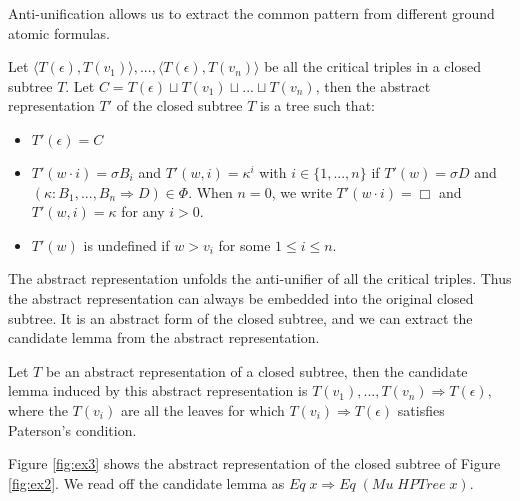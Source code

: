 \documentclass{llncs}
\newcommand{\Conid}[1]{\mathit{#1}}
\newcommand{\Varid}[1]{\mathit{#1}}
\renewcommand{\leq}{\leqslant}
\begin{document}
Anti-unification allows us to extract the common pattern from different ground atomic formulas.

\begin{definition}
  \label{abs:rep}
  Let $\langle T(\epsilon), T(v_1)\rangle,..., \langle T(\epsilon), T(v_n) \rangle$ be all the critical triples in a closed subtree $T$. 
  Let  $C = T(\epsilon) \sqcup T(v_1) \sqcup ... \sqcup T(v_n)$, then the abstract
  representation $T'$ of the closed subtree $T$ is a tree such that:
  \begin{itemize}
  \item $T'(\epsilon) = C$
  \item $T'(w \cdot i) = \sigma B_i$ and $T'(w, i) = \kappa^i$ with $i \in \{1
,..., n\}$ if $T'(w) = \sigma D$ and $(\kappa : B_1, ..., B_n \Rightarrow D) \in
\Phi$. When $n = 0$, we write $T'(w \cdot i) = \Box$ and $T'(w, i) = \kappa$ for
any $i > 0$.  
  \item $T'(w)$ is undefined if $w > v_i$ for some $1 \leq i \leq n$.
  \end{itemize}

\end{definition}

The abstract representation unfolds the anti-unifier of all the critical
triples. Thus the  abstract representation can always be embedded into the
original closed subtree. It is an abstract form of the closed subtree, and we
can extract the candidate lemma from the abstract representation.  
  
\begin{definition}
  \label{invariant}
  Let $T$ be an abstract representation of a closed subtree, then the candidate lemma
  induced by this abstract representation is $T(v_1),..., T(v_n) \Rightarrow T(\epsilon)$, 
  where the $T(v_i)$ are all the leaves for which $T(v_i) \Rightarrow T(\epsilon)$ satisfies Paterson's
  condition.
\end{definition}

Figure \ref{fig:ex3} shows the abstract representation of the closed subtree of Figure \ref{fig:ex2}.
We read off the candidate lemma as \ensuremath{\Conid{Eq}\;\Varid{x}\Rightarrow \Conid{Eq}\;(\Conid{Mu}\;\Conid{HPTree}\;\Varid{x})}. 
\end{document}
